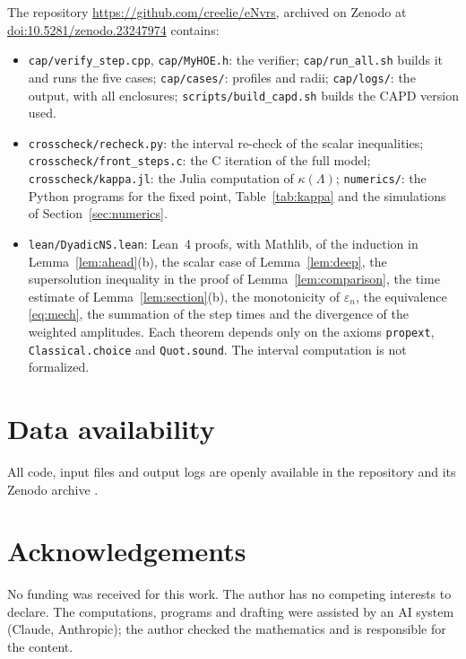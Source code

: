 \documentclass[12pt,reqno]{amsart}
\numberwithin{equation}{section}
\theoremstyle{plain}
\theoremstyle{definition}
\theoremstyle{remark}
\newcommand{\eps}{\varepsilon}
\newcommand{\zenodoline}{, archived on Zenodo at
  \href{https://doi.org/10.5281/zenodo.23247974}{doi:10.5281/zenodo.23247974}}
\begin{document}
The repository \url{https://github.com/creelie/eNvrs}\zenodoline{}
\cite{Data} contains:
\begingroup\sloppy
\begin{itemize}
\item \texttt{cap/verify\_step.cpp}, \texttt{cap/MyHOE.h}: the verifier;
  \texttt{cap/run\_all.sh} builds it and runs the five cases;
  \texttt{cap/cases/}: profiles and radii; \texttt{cap/logs/}: the output,
  with all enclosures; \texttt{scripts/build\_capd.sh} builds the CAPD
  version used.
\item \texttt{crosscheck/recheck.py}: the interval re-check of the scalar
  inequalities; \texttt{crosscheck/front\_steps.c}: the C iteration of the
  full model; \texttt{crosscheck/kappa.jl}: the Julia computation of
  $\kappa(\Lambda)$; \texttt{numerics/}: the Python programs for the fixed point,
  Table~\ref{tab:kappa} and the simulations of Section~\ref{sec:numerics}.
\item \texttt{lean/DyadicNS.lean}: Lean~4 proofs, with Mathlib, of the
  induction in Lemma~\ref{lem:ahead}(b), the scalar case of
  Lemma~\ref{lem:deep}, the supersolution inequality in the proof of
  Lemma~\ref{lem:comparison}, the time estimate of
  Lemma~\ref{lem:section}(b), the monotonicity of $\eps_n$, the
  equivalence \eqref{eq:mech}, the summation of the step times and the
  divergence of the weighted amplitudes. Each theorem depends only on the
  axioms \texttt{propext}, \texttt{Classical.choice} and \texttt{Quot.sound}.
  The interval computation is not formalized.
\end{itemize}
\endgroup


\section*{Data availability}
All code, input files and output logs are openly available in the
repository and its Zenodo archive \cite{Data}.

\section*{Acknowledgements}
No funding was received for this work. The author has no competing
interests to declare. The computations, programs and drafting were assisted
by an AI system (Claude, Anthropic); the author checked the mathematics and
is responsible for the content.
\end{document}
